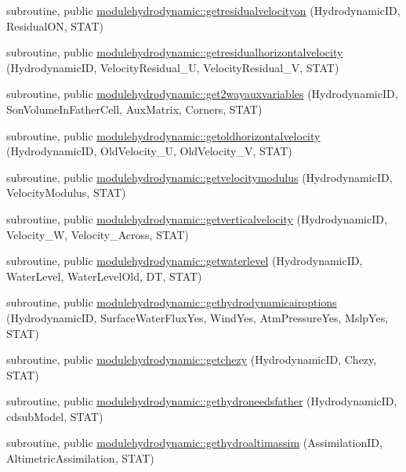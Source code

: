 \begin{DoxyCompactItemize}
subroutine, public \mbox{\hyperlink{namespacemodulehydrodynamic_a987751c28d42e91f65901a19ca158b03}{modulehydrodynamic\+::getresidualvelocityon}} (Hydrodynamic\+ID, Residual\+ON, S\+T\+AT)
\item 
subroutine, public \mbox{\hyperlink{namespacemodulehydrodynamic_a5e97af02320deab67308d99bcf2745e1}{modulehydrodynamic\+::getresidualhorizontalvelocity}} (Hydrodynamic\+ID, Velocity\+Residual\+\_\+U, Velocity\+Residual\+\_\+V, S\+T\+AT)
\item 
subroutine, public \mbox{\hyperlink{namespacemodulehydrodynamic_a64e767d6cd62ef19087fffd022d0ca4a}{modulehydrodynamic\+::get2wayauxvariables}} (Hydrodynamic\+ID, Son\+Volume\+In\+Father\+Cell, Aux\+Matrix, Corners, S\+T\+AT)
\item 
subroutine, public \mbox{\hyperlink{namespacemodulehydrodynamic_a7161ffc34f27ea1c9e5f1f9bdc165d07}{modulehydrodynamic\+::getoldhorizontalvelocity}} (Hydrodynamic\+ID, Old\+Velocity\+\_\+U, Old\+Velocity\+\_\+V, S\+T\+AT)
\item 
subroutine, public \mbox{\hyperlink{namespacemodulehydrodynamic_a898445cf253d8a76844408350387b376}{modulehydrodynamic\+::getvelocitymodulus}} (Hydrodynamic\+ID, Velocity\+Modulus, S\+T\+AT)
\item 
subroutine, public \mbox{\hyperlink{namespacemodulehydrodynamic_a6f64fd12742f48039f81460df9c0cd42}{modulehydrodynamic\+::getverticalvelocity}} (Hydrodynamic\+ID, Velocity\+\_\+W, Velocity\+\_\+\+Across, S\+T\+AT)
\item 
subroutine, public \mbox{\hyperlink{namespacemodulehydrodynamic_ad29ca3143969ea453d432e0a8f2dde2d}{modulehydrodynamic\+::getwaterlevel}} (Hydrodynamic\+ID, Water\+Level, Water\+Level\+Old, DT, S\+T\+AT)
\item 
subroutine, public \mbox{\hyperlink{namespacemodulehydrodynamic_a890cdf33bc8b461d93da82f9150c774e}{modulehydrodynamic\+::gethydrodynamicairoptions}} (Hydrodynamic\+ID, Surface\+Water\+Flux\+Yes, Wind\+Yes, Atm\+Pressure\+Yes, Mslp\+Yes, S\+T\+AT)
\item 
subroutine, public \mbox{\hyperlink{namespacemodulehydrodynamic_a377c174d00228d8f36d2d1c5e10a7f32}{modulehydrodynamic\+::getchezy}} (Hydrodynamic\+ID, Chezy, S\+T\+AT)
\item 
subroutine, public \mbox{\hyperlink{namespacemodulehydrodynamic_a391b4f9e43b2d5d986bedc666b00da4d}{modulehydrodynamic\+::gethydroneedsfather}} (Hydrodynamic\+ID, cdsub\+Model, S\+T\+AT)
\item 
subroutine, public \mbox{\hyperlink{namespacemodulehydrodynamic_a4d4e017a80d72328f2cdd7b71420fbf3}{modulehydrodynamic\+::gethydroaltimassim}} (Assimilation\+ID, Altimetric\+Assimilation, S\+T\+AT)

\end{DoxyCompactItemize}
